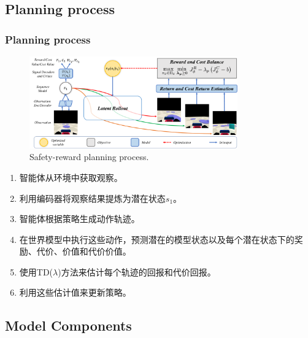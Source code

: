 \documentclass[10pt,mathserif]{beamer}%
\begin{document}
\subsection{Planning process}
\begin{frame}[t,fragile]
    \frametitle{Planning process}
    \begin{figure}[ht]
  \centering
  \includegraphics[width=0.8\textwidth]{images/architecture.pdf}
  \caption{Safety-reward planning process.}
  \label{fig:architecture}
\end{figure}
\vspace{-0.5cm}
\begin{spacing}{1.2}

\begin{enumerate}
\item 智能体从环境中获取观察。
\item 利用编码器将观察结果提炼为潜在状态$s_1$。
\item 智能体根据策略生成动作轨迹。
\item 在世界模型中执行这些动作，预测潜在的模型状态以及每个潜在状态下的奖励、代价、价值和代价价值。
\item 使用TD($\lambda$)方法来估计每个轨迹的回报和代价回报。
\item 利用这些估计值来更新策略。
\end{enumerate}
    
\end{spacing}

\end{frame}


\subsection{Model Components}
\end{document}
